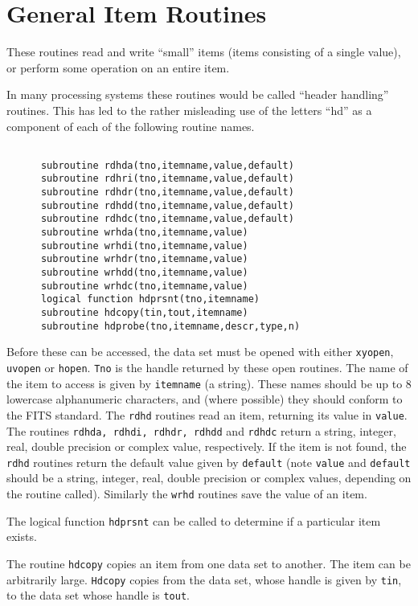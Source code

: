 \documentclass{report}
\begin{document}
\section{General Item Routines}
These routines read and write ``small'' items (items consisting of a single
value), or perform some operation on an entire item.

In many processing systems these routines would be called ``header handling''
routines. This has led to the rather misleading use of the
letters ``hd'' as a component of each of the following routine names.
\begin{verbatim}

      subroutine rdhda(tno,itemname,value,default)
      subroutine rdhri(tno,itemname,value,default)
      subroutine rdhdr(tno,itemname,value,default)
      subroutine rdhdd(tno,itemname,value,default)
      subroutine rdhdc(tno,itemname,value,default)
      subroutine wrhda(tno,itemname,value)
      subroutine wrhdi(tno,itemname,value)
      subroutine wrhdr(tno,itemname,value)
      subroutine wrhdd(tno,itemname,value)
      subroutine wrhdc(tno,itemname,value)
      logical function hdprsnt(tno,itemname)
      subroutine hdcopy(tin,tout,itemname)
      subroutine hdprobe(tno,itemname,descr,type,n)

\end{verbatim}
Before these can be accessed, the data set must be
opened with either {\tt xyopen}, {\tt uvopen} or {\tt hopen}. {\tt Tno} is the
handle returned by these open routines.
The name of the item to access is given by {\tt itemname} (a string).
These names should be up to 8 lowercase alphanumeric
characters, and (where possible) they should conform to the FITS standard.
The {\tt rdhd} routines read an item, returning its value in {\tt value}.
The routines {\tt rdhda, rdhdi, rdhdr, rdhdd} and {\tt rdhdc} return a string,
integer, real, double precision or complex value, respectively. If the item
is not found, the {\tt rdhd} routines return the default value given
by {\tt default} (note {\tt value} and {\tt default} should be a string,
integer, real, double precision or complex values, depending on the routine
called). Similarly
the {\tt wrhd} routines save the value of an item.

The logical function {\tt hdprsnt} can be called to determine if a
particular item exists.

The routine {\tt hdcopy} copies an item from one data set to another.
The item can be
arbitrarily large. {\tt Hdcopy} copies from the data set, whose handle
is given by {\tt tin}, to the data set whose handle is {\tt tout}.
\end{document}
